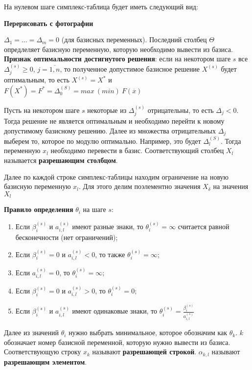 \documentclass{article}
\begin{document}
На нулевом шаге симплекс-таблица будет иметь следующий вид:

\textbf{Перерисовать с фотографии}

$\Delta_1 = \dots = \Delta_{m} = 0$ (для базисных переменных). Последний столбец $\Theta$ опредлеляет базисную переменную, которую необходимо вывести из базиса. \textbf{Признак оптимальности достигнутого решения}: если на некотором шаге $s$ все $\Delta_{j}^{(s)} \ge 0$, $j = \overline{1, n}$, то полученное допустимое базисное решение $X^{(s)}$ будет оптимальным, то есть $X^{(s)} = X^{*}$ и $F(X^{*}) = F^{*} = \Delta_{0}^{(S)} = max \ (min) \ F(\overline{x})$

Пусть на некотором шаге $s$ некоторые из $\Delta_{j}^{(s)}$ отрицательны, то есть $\Delta_{j} < 0$. Тогда решение не является оптимальным и необходимо перейти к новому допустимому базисному решению. Далее из множества отрицательных $\Delta_{j}$ выберем то, которое по модулю оптимально. Например, это будет $\Delta_{l}^{(S)}$. Тогда переменную $x_{l}$ необходимо перевести в базис. Соответствующий столбец $X_{l}$ называется \textbf{разрешающим столбцом}. 

Далее по каждой строке симплекс-таблицы находим ограничение на новую базисную переменную $x_{l}$. Для этого делим поэлементно значения $X_{\delta}$ на значения $X_{l}$

\textbf{Правило определения} $\theta_{i}$ на шаге $s$:

\begin{enumerate}
    \item Если $\beta_{i}^{(s)}$ и $a_{i, l}^{(s)}$ имеют разные знаки, то $\theta_{i}^{(s)} = \infty$ считается равной бесконечности (нет ограничений);
    \item Если $\beta_{i}^{(s)} = 0$ и $a_{i, l}^{(s)} < 0$, то также $\theta_{i}^{(s)} = \infty$;
    \item Если $a_{i, l}^{(s)} = 0$, то $\theta_{i}^{(s)} = \infty$;
    \item Если $\beta_{i}^{(s)} = 0$ и $a_{i, l}^{(s)} > 0$, то $\theta_{i}^{(s)} = 0$;
    \item Если $\beta_{i}^{(s)} $ и $a_{i, l}^{(s)}$ имеют одинаковые знаки, то $\theta_{i}^{(s)} = \frac{\beta_{i}^{(s)}}{a_{i, l}^{(s)}}$
\end{enumerate}

Далее из значений $\theta_{i}$ нужно выбрать минимальное, которое обозначим как $\theta_{k}$. $k$ обозначает номер базисной переменной, которую нужно вывести из базиса. Соответствующую строку $x_{k}$ называют \textbf{разрешающей строкой}. $\alpha_{k, l}$ называют \textbf{разрешающим элементом}.
\end{document}

